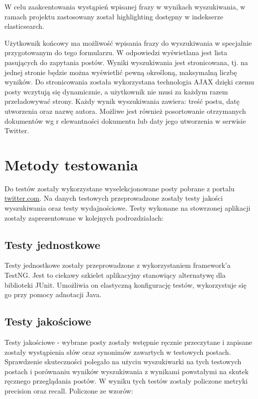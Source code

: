 \documentclass[runningheads]{llncs}
\begin{document}
W celu zaakcentowania wystąpień wpisanej frazy w wynikach wyszukiwania,  w
ramach projektu zastosowany został highlighting dostępny w indekserze
elasticsearch.

Użytkownik końcowy ma możliwość wpisania frazy do wyszukiwania w
specjalnie przygotowanym do tego formularzu. W odpowiedzi wyświetlana jest lista
pasujących do zapytania postów. Wyniki wyszukiwania jest stronicowana, tj.
na jednej stronie będzie można wyświetlić pewną określoną,  maksymalną liczbę
wyników. Do stronicowania została wykorzystana technologia AJAX dzięki czemu
posty wczytują się dynamicznie, a użytkownik nie musi za każdym razem
przeładowywać strony. Każdy wynik wyszukiwania zawiera:
treść postu, datę utworzenia oraz nazwę autora.  Możliwe jest również
posortowanie otrzymanych dokumentów wg r elewantności dokumentu lub daty jego
utworzenia w serwisie Twitter.

\section{Metody testowania}
\label{sec:metody-testowania}

Do testów zostały wykorzystane wyselekcjonowane posty pobrane z portalu
\url{twitter.com}.
Na danych testowych przeprowadzone zostały testy jakości wyszukiwania oraz testy
wydajnościowe. Testy wykonane na stowrzonej aplikacji zostały zaprezentowane w
kolejnych podrozdziałach:
\subsection{Testy jednostkowe}
Testy jednostkowe zostały przeprowadzone z wykorzystaniem framework’a TestNG.
Jest to ciekawy szkielet aplikacyjny stanowiący alternatywę dla biblioteki
JUnit. Umożliwia on elastyczną konfigurację testów, wykorzystuje się go przy
pomocy adnotacji Java.
 
 \subsection{Testy jakościowe}
 Testy jakościowe - wybrane posty zostały wstępnie ręcznie przeczytane i 
  zapisane zostały wystąpienia słów oraz synonimów zawartych w testowych
  postach.
	Sprawdzenie skuteczności polegało na użyciu wyszukiwarki na  tych testowych
	postach i porównaniu wyników wyszukiwania z wynikami powstałymi  na skutek
	ręcznego przeglądania postów. W wyniku tych testów zostały policzone  metryki
	precision oraz  recall. Policzone ze wzorów:
  
\end{document}
